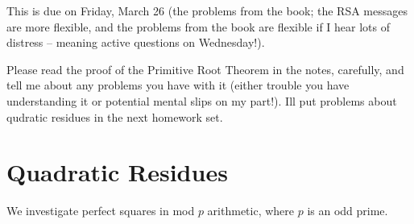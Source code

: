 \documentclass[12pt]{article}
\begin{document}
This is due on Friday, March 26 (the problems from the book; the RSA messages are more flexible, and the problems from the book are flexible if I hear lots of distress -- meaning active questions on Wednesday!).

Please read the proof of the Primitive Root Theorem in the notes, carefully, and tell me about any problems you have with it (either trouble you have understanding it or potential mental slips on my part!). Ill put problems about qudratic residues in the next homework set.

\section{Quadratic Residues}

We investigate perfect squares in mod $p$ arithmetic, where $p$ is an odd prime.
\end{document}
